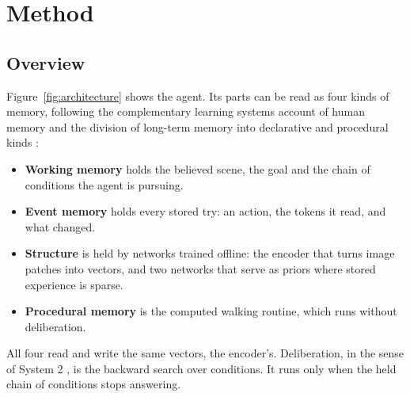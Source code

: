 \documentclass{article}
\begin{document}
\section{Method}
\label{sec:method}

\subsection{Overview}

Figure~\ref{fig:architecture} shows the agent. Its parts can be read as four kinds of memory, following the complementary learning systems account of human memory and the division of long-term memory into declarative and procedural kinds \cite{McClelland1995,Kumaran2016,Squire2004}:
\begin{itemize}
    \item \textbf{Working memory} holds the believed scene, the goal and the chain of conditions the agent is pursuing.
    \item \textbf{Event memory} holds every stored try: an action, the tokens it read, and what changed.
    \item \textbf{Structure} is held by networks trained offline: the encoder that turns image patches into vectors, and two networks that serve as priors where stored experience is sparse.
    \item \textbf{Procedural memory} is the computed walking routine, which runs without deliberation.
\end{itemize}
All four read and write the same vectors, the encoder's. Deliberation, in the sense of System 2 \cite{Kahneman2011}, is the backward search over conditions. It runs only when the held chain of conditions stops answering.
\end{document}
